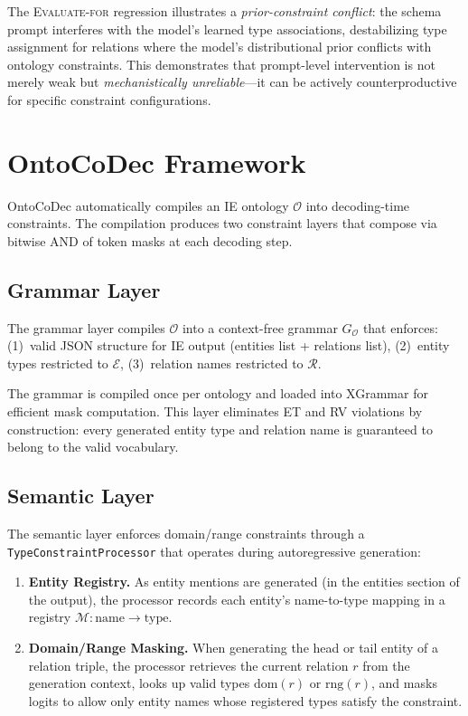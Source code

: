 \documentclass[11pt,a4paper]{article}
\newcommand{\sys}{OntoCoDec}
\begin{document}
The \textsc{Evaluate-for} regression illustrates a \emph{prior-constraint conflict}: the schema prompt interferes with the model's learned type associations, destabilizing type assignment for relations where the model's distributional prior conflicts with ontology constraints.
This demonstrates that prompt-level intervention is not merely weak but \emph{mechanistically unreliable}---it can be actively counterproductive for specific constraint configurations.

\section{\sys{} Framework}
\label{sec:method}

\sys{} automatically compiles an IE ontology $\mathcal{O}$ into decoding-time constraints.
The compilation produces two constraint layers that compose via bitwise AND of token masks at each decoding step.

\subsection{Grammar Layer}

The grammar layer compiles $\mathcal{O}$ into a context-free grammar $G_\mathcal{O}$ that enforces:
(1)~valid JSON structure for IE output (entities list + relations list),
(2)~entity types restricted to $\mathcal{E}$,
(3)~relation names restricted to $\mathcal{R}$.

The grammar is compiled once per ontology and loaded into XGrammar for efficient mask computation.
This layer eliminates ET and RV violations by construction: every generated entity type and relation name is guaranteed to belong to the valid vocabulary.

\subsection{Semantic Layer}

The semantic layer enforces domain/range constraints through a \texttt{TypeConstraintProcessor} that operates during autoregressive generation:

\begin{enumerate}
\item \textbf{Entity Registry.} As entity mentions are generated (in the entities section of the output), the processor records each entity's name-to-type mapping in a registry $\mathcal{M}: \text{name} \to \text{type}$.
\item \textbf{Domain/Range Masking.} When generating the head or tail entity of a relation triple, the processor retrieves the current relation $r$ from the generation context, looks up valid types $\text{dom}(r)$ or $\text{rng}(r)$, and masks logits to allow only entity names whose registered types satisfy the constraint.
\end{enumerate}
\end{document}
